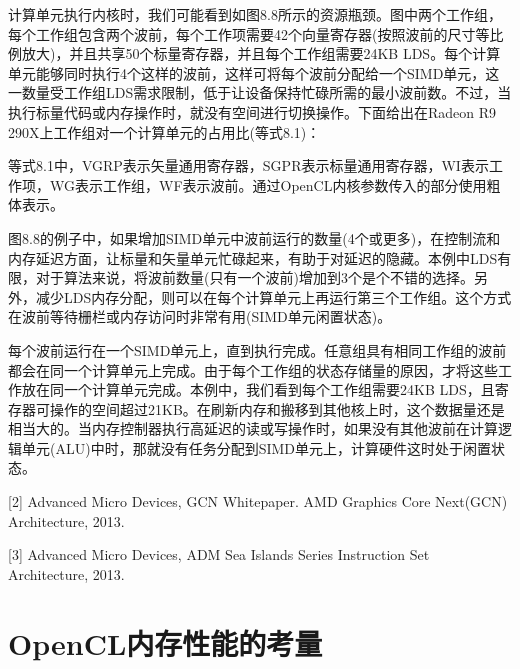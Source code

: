 计算单元执行内核时，我们可能看到如图8.8所示的资源瓶颈。图中两个工作组，每个工作组包含两个波前，每个工作项需要42个向量寄存器(按照波前的尺寸等比例放大)，并且共享50个标量寄存器，并且每个工作组需要24KB LDS。每个计算单元能够同时执行4个这样的波前，这样可将每个波前分配给一个SIMD单元，这一数量受工作组LDS需求限制，低于让设备保持忙碌所需的最小波前数。不过，当执行标量代码或内存操作时，就没有空间进行切换操作。下面给出在Radeon R9 290X上工作组对一个计算单元的占用比(等式8.1)：



等式8.1中，VGRP表示矢量通用寄存器，SGPR表示标量通用寄存器，WI表示工作项，WG表示工作组，WF表示波前。通过OpenCL内核参数传入的部分使用粗体表示。

图8.8的例子中，如果增加SIMD单元中波前运行的数量(4个或更多)，在控制流和内存延迟方面，让标量和矢量单元忙碌起来，有助于对延迟的隐藏。本例中LDS有限，对于算法来说，将波前数量(只有一个波前)增加到3个是个不错的选择。另外，减少LDS内存分配，则可以在每个计算单元上再运行第三个工作组。这个方式在波前等待栅栏或内存访问时非常有用(SIMD单元闲置状态)。

每个波前运行在一个SIMD单元上，直到执行完成。任意组具有相同工作组的波前都会在同一个计算单元上完成。由于每个工作组的状态存储量的原因，才将这些工作放在同一个计算单元完成。本例中，我们看到每个工作组需要24KB LDS，且寄存器可操作的空间超过21KB。在刷新内存和搬移到其他核上时，这个数据量还是相当大的。当内存控制器执行高延迟的读或写操作时，如果没有其他波前在计算逻辑单元(ALU)中时，那就没有任务分配到SIMD单元上，计算硬件这时处于闲置状态。

\myRefRule

\begin{myRefs}

[2] Advanced Micro Devices, GCN Whitepaper. AMD Graphics Core Next(GCN) Architecture, 2013. 

[3] Advanced Micro Devices, ADM Sea Islands Series Instruction Set Architecture, 2013. 

\end{myRefs}



\section{OpenCL内存性能的考量}

